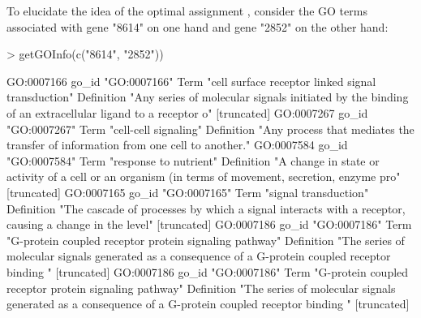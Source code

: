 \documentclass[12pt,a4paper]{article}
\begin{document}
To elucidate the idea of the optimal assignment \cite{FroeSpeerGOKer06}, consider the GO terms associated with gene "8614" on one hand and gene "2852" on the other hand:
\begin{Schunk}
\begin{Sinput}
> getGOInfo(c("8614", "2852"))
\end{Sinput}
\begin{Soutput}
           GO:0007166                                                                                                       
go_id      "GO:0007166"                                                                                                     
Term       "cell surface receptor linked signal transduction"                                                               
Definition "Any series of molecular signals initiated by the binding of an extracellular ligand to a receptor o" [truncated]
           GO:0007267                                                                       
go_id      "GO:0007267"                                                                     
Term       "cell-cell signaling"                                                            
Definition "Any process that mediates the transfer of information from one cell to another."
           GO:0007584                                                                                                       
go_id      "GO:0007584"                                                                                                     
Term       "response to nutrient"                                                                                           
Definition "A change in state or activity of a cell or an organism (in terms of movement, secretion, enzyme pro" [truncated]
           GO:0007165                                                                                                       
go_id      "GO:0007165"                                                                                                     
Term       "signal transduction"                                                                                            
Definition "The cascade of processes by which a signal interacts with a receptor, causing a change in the level" [truncated]
           GO:0007186                                                                                                       
go_id      "GO:0007186"                                                                                                     
Term       "G-protein coupled receptor protein signaling pathway"                                                           
Definition "The series of molecular signals generated as a consequence of a G-protein coupled receptor binding " [truncated]
           GO:0007186                                                                                                       
go_id      "GO:0007186"                                                                                                     
Term       "G-protein coupled receptor protein signaling pathway"                                                           
Definition "The series of molecular signals generated as a consequence of a G-protein coupled receptor binding " [truncated]
\end{Soutput}
\end{Schunk}
\end{document}
